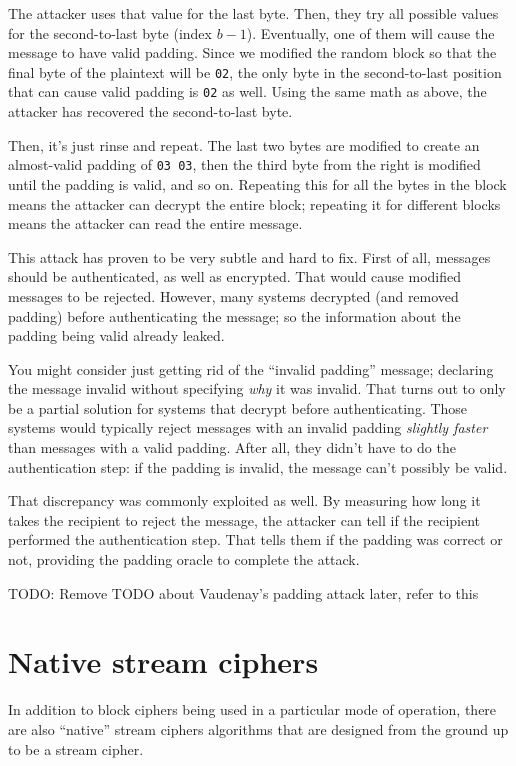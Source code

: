 \documentclass[11pt,ebook,table,dvipsnames]{memoir}
\begin{document}
The attacker uses that value for the last byte. Then, they try all
possible values for the second-to-last byte (index $b - 1$).
Eventually, one of them will cause the message to have valid padding.
Since we modified the random block so that the final byte of the
plaintext will be \verb|02|, the only byte in the second-to-last
position that can cause valid padding is \verb|02| as well. Using the
same math as above, the attacker has recovered the second-to-last
byte.

Then, it's just rinse and repeat. The last two bytes are modified to
create an almost-valid padding of \verb|03 03|, then the third byte
from the right is modified until the padding is valid, and so on.
Repeating this for all the bytes in the block means the attacker can
decrypt the entire block; repeating it for different blocks means the
attacker can read the entire message.

This attack has proven to be very subtle and hard to fix. First of
all, messages should be authenticated, as well as encrypted. That
would cause modified messages to be rejected. However, many systems
decrypted (and removed padding) before authenticating the message; so
the information about the padding being valid already leaked.

You might consider just getting rid of the \enquote{invalid padding} message;
declaring the message invalid without specifying \emph{why} it was invalid.
That turns out to only be a partial solution for systems that decrypt
before authenticating. Those systems would typically reject messages
with an invalid padding \emph{slightly faster} than messages with a valid
padding. After all, they didn't have to do the authentication step: if
the padding is invalid, the message can't possibly be valid.

That discrepancy was commonly exploited as well. By measuring how long
it takes the recipient to reject the message, the attacker can tell if
the recipient performed the authentication step. That tells them if
the padding was correct or not, providing the padding oracle to
complete the attack.

TODO: Remove TODO about Vaudenay's padding attack later, refer to this
\section{Native stream ciphers}
\label{sec-2-3-8}

In addition to block ciphers being used in a particular mode of
operation, there are also \enquote{native} \glspl{stream cipher} algorithms
that are designed from the ground up to be a stream cipher.
\end{document}
